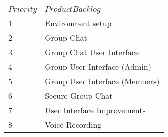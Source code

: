 \documentclass[a4paper,12pt]{article}
\begin{document}
\begin{tabular}{|l|l|}
\hline
$Priority$	& $Product Backlog$\\
\hline
1 &	Environment setup\\
2 &	Group Chat\\
3 &	Group Chat User Interface\\
4 &	Group User Interface (Admin)\\
5 &	Group User Interface (Members)\\
6 &	Secure Group Chat\\
7 &	User Interface Improvements\\
8 &	Voice Recording\\
\hline
\end{tabular}
\end{document}
